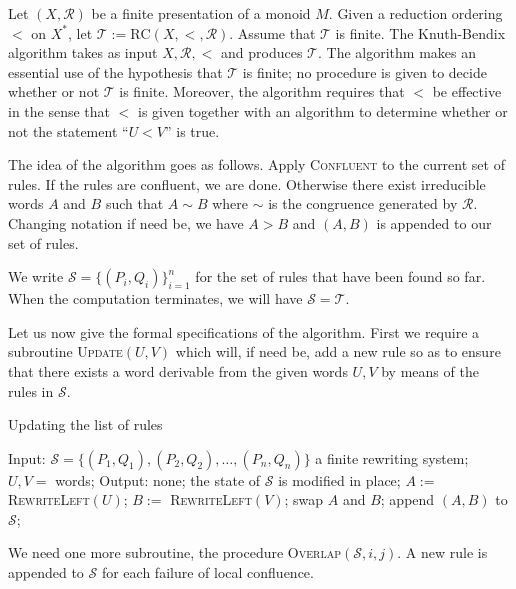 \begin{ap} Let $(X,\mathcal{R})$ be a finite presentation of a monoid $M$.
    Given a reduction ordering $<$ on $X^*$, let $\mathcal{T} :=
    \mathrm{RC}(X,<,\mathcal{R})$. Assume that $\mathcal{T}$ is finite. The
    Knuth-Bendix algorithm takes as input $X,\mathcal{R}, <$ and produces
    $\mathcal{T}$. The algorithm makes an essential use of the hypothesis that
    $\mathcal{T}$ is finite; no procedure is given to decide whether or not
    $\mathcal{T}$ is finite. Moreover, the algorithm requires that $<$ be
    effective in the sense that $<$ is given together with an algorithm to
    determine whether or not the statement ``$U < V$'' is true.

    The idea of the algorithm goes as follows. Apply \textsc{Confluent} to the
    current set of rules. If the rules are confluent, we are done. Otherwise
    there exist irreducible words $A$ and $B$ such that $A\sim B$ where $\sim$
    is the congruence generated by $\mathcal{R}$. Changing notation if need be,
    we have $A > B$ and $(A,B)$ is appended to our set of rules.

    We write $\mathcal{S} = \{(P_i,Q_i)\}_{i=1}^n$ for the set of rules that
    have been found so far. When the computation terminates, we will have
    $\mathcal{S} = \mathcal{T}$.

    Let us now give the formal specifications of the algorithm. First we
    require a subroutine \textsc{Update}$(U,V)$ which will, if need be, add a
    new rule so as to ensure that there exists a word derivable from the given
    words $U,V$ by means of the rules in $\mathcal{S}$.

\newpage{}

\begin{algorithm}
\caption{Updating the list of rules}
\begin{algorithmic}[1]
    \State Input: $\mathcal{S} = \{(P_1,Q_1), (P_2,Q_2), \dots,(P_n,Q_n)\}$ a finite rewriting system; $U,V = $ words;
    \State Output: none; the state of $\mathcal{S}$ is modified in place;
    \State $A :=$ \textsc{RewriteLeft}$(U)$;
    \State $B :=$ \textsc{RewriteLeft}$(V)$;
    \State swap $A$ and $B$;
    \EndIf
    \State append $(A,B)$ to $\mathcal{S}$;
    \EndIf
    \EndProcedure
\end{algorithmic}
\end{algorithm}

We need one more subroutine, the procedure \textsc{Overlap}$(\mathcal{S},
i,j)$. A new rule is appended to $\mathcal{S}$ for each failure of local
confluence.


\end{ap}
